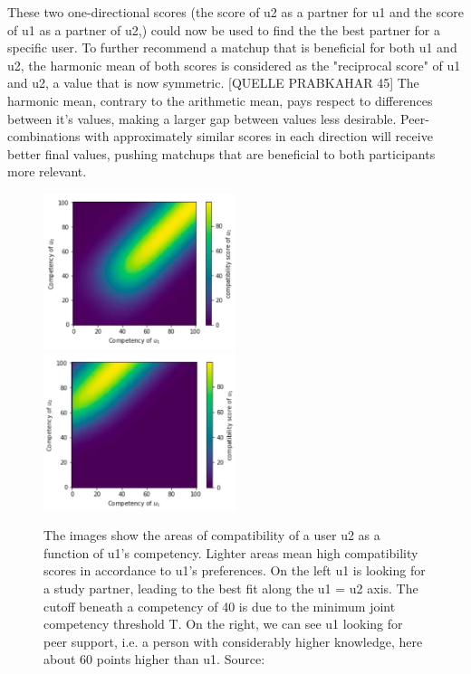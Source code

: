\documentclass[nochapterpage,bigchapter,linedtoc,longdoc,colorback,accentcolor=tud3b,oneside]{tudreport}
\begin{document}
These two one-directional scores (the score of u2 as a partner for u1 and the score of u1 as a partner of u2,) could now be used to find the the best partner for a specific user. To further recommend a matchup that is beneficial for both u1 and u2, the harmonic mean of both scores is considered as the "reciprocal score" of u1 and u2, a value that is now symmetric. [QUELLE PRABKAHAR 45] The harmonic mean, contrary to the arithmetic mean, pays respect to differences between it's values, making a larger gap between values less desirable. Peer-combinations with approximately similar scores in each direction will receive better final values, pushing matchups that are beneficial to both participants more relevant.\\
\begin{figure}[h]
	\includegraphics[width=0.5\textwidth]{g/SeekingPartnerCompatibility.PNG}
	\includegraphics[width=0.5\textwidth]{g/SeekingSupportCompatibility.PNG}
	\caption{The images show the areas of compatibility of a user u2 as a function of u1's competency. Lighter areas mean high compatibility scores in accordance to u1's preferences. On the left u1 is looking for a study partner, leading to the best fit along the u1 = u2 axis. The cutoff beneath a competency of 40 is due to the minimum joint competency threshold T. On the right, we can see u1 looking for peer support, i.e. a person with considerably higher knowledge, here about 60 points higher than u1. Source: \cite{potts2018reciprocal}}
	\label{f:Seeking}
\end{figure}
\end{document}
